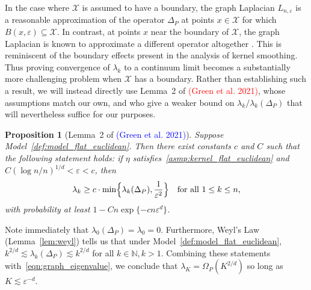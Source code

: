 \documentclass{article}
\newcommand{\1}{\mathbf{1}}
\newcommand{\mc}[1]{\mathcal{#1}}
\theoremstyle{alden}
\theoremstyle{aldenthm}
\newtheorem{proposition}{Proposition}
\theoremstyle{definition}
\theoremstyle{remark}
\begin{document}
In the case where $\mc{X}$ is assumed to have a boundary, the graph Laplacian $L_{n,\varepsilon}$ is a reasonable approximation of the operator $\Delta_P$ at points $x \in \mc{X}$ for which $B(x,\varepsilon) \subseteq \mc{X}$. In contrast, at points $x$ near the boundary of $\mc{X}$, the graph Laplacian is known to approximate a different operator altogether \citep{belkin2012}. This is reminiscent of the boundary effects present in the analysis of kernel smoothing. Thus proving convergence of $\lambda_k$ to a continuum limit becomes a substantially more challenging problem when $\mc{X}$ has a boundary. Rather than establishing such a result, we will instead directly use Lemma~2 of \textcolor{red}{(Green et al. 2021)}, whose assumptions match our own, and who give a weaker bound on $\lambda_k/\lambda_k(\Delta_P)$ that will nevertheless suffice for our purposes. 

\begin{proposition}[Lemma~2 of \textcolor{blue}{(Green et al. 2021)}]
	\label{prop:graph_eigenvalue}
	Suppose Model~\ref{def:model_flat_euclidean}. Then there exist constants $c$ and $C$ such that the following statement holds: if $\eta$ satisfies~\ref{asmp:kernel_flat_euclidean} and $C(\log n/n)^{1/d} < \varepsilon < c$, then
	\begin{equation}
	\label{eqn:graph_eigenvalue}
	\lambda_k \geq c \cdot \min\Bigl\{\lambda_k(\Delta_P), \frac{1}{\varepsilon^{2}} \Bigr\} \quad \textrm{for all $1 \leq k \leq n$,}
	\end{equation}
	with probability at least $1 - Cn\exp\{-c n\varepsilon^d\}$. 
\end{proposition}
Note immediately that $\lambda_0(\Delta_P) = \lambda_0 = 0$. Furthermore, Weyl's Law (Lemma~\ref{lem:weyl}) tells us that under Model~\ref{def:model_flat_euclidean}, $k^{2/d} \lesssim \lambda_{k}(\Delta_P) \lesssim k^{2/d}$ for all $k \in \mathbb{N}, k > 1$. Combining these statements with~\eqref{eqn:graph_eigenvalue}, we conclude that $\lambda_{K} = \Omega_P(K^{2/d})$ so long as $K \lesssim \varepsilon^{-d}$. 
\end{document}
